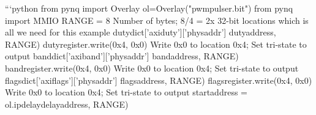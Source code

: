 \markdownRendererDocumentBegin
\markdownRendererSectionBegin
{}\markdownRendererInterblockSeparator
{}```python from pynq import Overlay ol=Overlay("pwmpulser.bit")\markdownRendererInterblockSeparator
{}from pynq import MMIO RANGE = 8 \markdownRendererHash{} Number of bytes; 8/4 = 2x 32-bit locations which is all we need for this example\markdownRendererInterblockSeparator
{}dutydict['axiduty']['phys\markdownRendererUnderscore{}addr'] dutyaddress, RANGE) \markdownRendererInterblockSeparator
{}
\markdownRendererSectionEnd \markdownRendererSectionBegin
{}\markdownRendererInterblockSeparator
{}duty\markdownRendererUnderscore{}register.write(0x4, 0x0) \markdownRendererHash{} Write 0x0 to location 0x4; Set tri-state to output\markdownRendererInterblockSeparator
{}banddict['axiband']['phys\markdownRendererUnderscore{}addr'] bandaddress, RANGE) \markdownRendererInterblockSeparator
{}
\markdownRendererSectionEnd \markdownRendererSectionBegin
{}\markdownRendererInterblockSeparator
{}band\markdownRendererUnderscore{}register.write(0x4, 0x0) \markdownRendererHash{} Write 0x0 to location 0x4; Set tri-state to output\markdownRendererInterblockSeparator
{}flagsdict['axiflags']['phys\markdownRendererUnderscore{}addr'] flagsaddress, RANGE) \markdownRendererInterblockSeparator
{}
\markdownRendererSectionEnd \markdownRendererSectionBegin
{}\markdownRendererInterblockSeparator
{}flags\markdownRendererUnderscore{}register.write(0x4, 0x0) \markdownRendererHash{} Write 0x0 to location 0x4; Set tri-state to output\markdownRendererInterblockSeparator
{}startaddress = ol.ipdelaydelay\markdownRendererUnderscore{}address, RANGE) \markdownRendererInterblockSeparator
